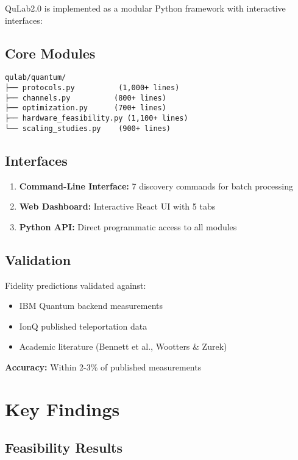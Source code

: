 \documentclass[11pt,a4paper]{article}
\begin{document}
QuLab2.0 is implemented as a modular Python framework with interactive interfaces:

\subsection{Core Modules}

\begin{verbatim}
qulab/quantum/
├── protocols.py          (1,000+ lines)
├── channels.py          (800+ lines)
├── optimization.py      (700+ lines)
├── hardware_feasibility.py (1,100+ lines)
└── scaling_studies.py    (900+ lines)
\end{verbatim}

\subsection{Interfaces}

\begin{enumerate}
    \item \textbf{Command-Line Interface:} 7 discovery commands for batch processing
    \item \textbf{Web Dashboard:} Interactive React UI with 5 tabs
    \item \textbf{Python API:} Direct programmatic access to all modules
\end{enumerate}

\subsection{Validation}

Fidelity predictions validated against:
\begin{itemize}
    \item IBM Quantum backend measurements
    \item IonQ published teleportation data
    \item Academic literature (Bennett et al., Wootters \& Zurek)
\end{itemize}

\textbf{Accuracy:} Within 2-3\% of published measurements

\section{Key Findings}

\subsection{Feasibility Results}
\end{document}
